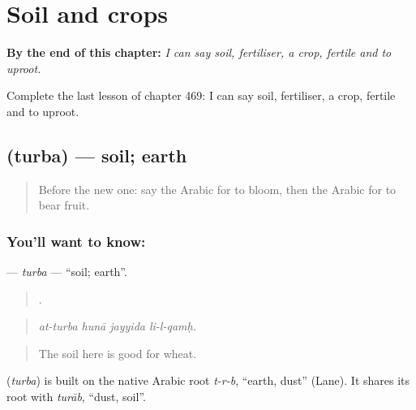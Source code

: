 
\chapter{Soil and crops}
\label{ch:ar-soil-and-crops}

\begin{chapteropening}
\textbf{By the end of this chapter:} \emph{I can say soil, fertiliser, a crop, fertile and to uproot.}

Complete the last lesson of chapter 469: I can say soil, fertiliser, a crop, fertile and to uproot.
\end{chapteropening}

\section[\texorpdfstring{\ar{تربة} (turba)}{تربة (turba)}]{ (turba) — soil; earth}

\label{lesson:AR-C469-turba}



\begin{quote}
Before the new one: say the Arabic for to bloom, then the Arabic for to bear fruit.
\end{quote}

\subsection*{You'll want to know: }
\textbf{} — \emph{turba} — \textquotedblleft{}soil; earth\textquotedblright{}.

\begin{quote}
   .
\end{quote}

\begin{quote}
\emph{at-turba hunā jayyida li-l-qamḥ.}
\end{quote}

\begin{quote}
The soil here is good for wheat.
\end{quote}

\begin{cousinweb}
\textbf{} (\emph{turba}) is built on the native Arabic root \emph{t-r-b}, \textquotedblleft{}earth, dust\textquotedblright{} (Lane). It shares its root with \emph{turāb}, \textquotedblleft{}dust, soil\textquotedblright{}.
\end{cousinweb}

